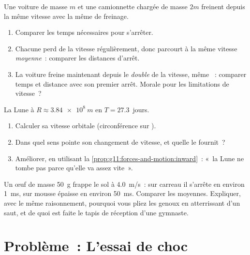 \begin{exercise}[$\star\star\star$]\label{exo:g11:forces-and-motion:13}
Une voiture de masse $m$ et une camionnette chargée de masse $2m$
freinent depuis la même vitesse avec la même
 de freinage.
\begin{enumerate}
  \item Comparer les temps nécessaires pour s'arrêter.
  \item Chacune perd de la vitesse régulièrement, donc parcourt à la
        même vitesse \emph{moyenne}~: comparer les distances
        d'arrêt.
  \item La voiture freine maintenant depuis le \emph{double} de la
        vitesse, même ~: comparer temps et
        distance avec son premier arrêt. Morale pour les limitations de
        vitesse~?
\end{enumerate}
\end{exercise}

\begin{exercise}[$\star\star\star$]\label{exo:g11:forces-and-motion:14}
La Lune  à
$R \approx \qty{3.84e8}{m}$ en $T = \num{27.3}$~jours.
\begin{enumerate}
  \item Calculer sa vitesse orbitale (circonférence sur
        ).
  \item Dans quel sens pointe son changement de vitesse, et quelle
         le fournit~?
  \item Améliorer, en utilisant la
        \cref{prop:g11:forces-and-motion:inward}~: «~la Lune ne tombe pas
        parce qu'elle va assez vite~».
\end{enumerate}
\end{exercise}

\begin{exercise}[$\star\star\star$]\label{exo:g11:forces-and-motion:15}
Un œuf de masse \qty{50}{g} frappe le sol à \qty{4.0}{m/s}~: sur carreau
il s'arrête en environ \qty{1}{ms}, sur mousse épaisse en environ
\qty{50}{ms}. Comparer les  moyennes.
Expliquer, avec le même raisonnement, pourquoi vous pliez les genoux en
atterrissant d'un saut, et de quoi est faite le tapis de réception d'une
gymnaste.
\end{exercise}

\section{Problème~: L'essai de choc}

